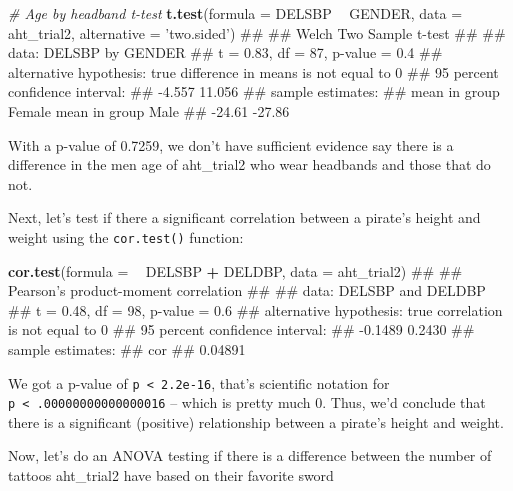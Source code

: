 \documentclass[12pt,]{krantz}
\makeatletter
\newenvironment{Shaded}{\begin{snugshade}}{\end{snugshade}}
\newcommand{\KeywordTok}[1]{\textcolor[rgb]{0.13,0.29,0.53}{\textbf{#1}}}
\newcommand{\DataTypeTok}[1]{\textcolor[rgb]{0.13,0.29,0.53}{#1}}
\newcommand{\StringTok}[1]{\textcolor[rgb]{0.31,0.60,0.02}{#1}}
\newcommand{\CommentTok}[1]{\textcolor[rgb]{0.56,0.35,0.01}{\textit{#1}}}
\newcommand{\OperatorTok}[1]{\textcolor[rgb]{0.81,0.36,0.00}{\textbf{#1}}}
\newcommand{\NormalTok}[1]{#1}
\newenvironment{kframe}{%
\medskip{}
\setlength{\fboxsep}{.8em}
 \def\at@end@of@kframe{}%
 \ifinner\ifhmode%
  \def\at@end@of@kframe{\end{minipage}}%
  \begin{minipage}{\columnwidth}%
 \fi\fi%
 \def\FrameCommand##1{\hskip\@totalleftmargin \hskip-\fboxsep
 \colorbox{shadecolor}{##1}\hskip-\fboxsep
     \hskip-\linewidth \hskip-\@totalleftmargin \hskip\columnwidth}%
 \MakeFramed {\advance\hsize-\width
   \@totalleftmargin\z@ \linewidth\hsize
   \@setminipage}}%
 {\par\unskip\endMakeFramed%
 \at@end@of@kframe}
\renewenvironment{Shaded}{\begin{kframe}}{\end{kframe}}
\theoremstyle{definition}
\theoremstyle{definition}
\theoremstyle{remark}
\makeatother
\begin{document}
\begin{Shaded}
\begin{Highlighting}[]
\CommentTok{# Age by headband t-test}
\KeywordTok{t.test}\NormalTok{(}\DataTypeTok{formula =}\NormalTok{  DELSBP }\OperatorTok{~}\StringTok{ }\NormalTok{GENDER,}
       \DataTypeTok{data =}\NormalTok{ aht_trial2,}
       \DataTypeTok{alternative =} \StringTok{'two.sided'}\NormalTok{)}
\NormalTok{## }
\NormalTok{##  Welch Two Sample t-test}
\NormalTok{## }
\NormalTok{## data:  DELSBP by GENDER}
\NormalTok{## t = 0.83, df = 87, p-value = 0.4}
\NormalTok{## alternative hypothesis: true difference in means is not equal to 0}
\NormalTok{## 95 percent confidence interval:}
\NormalTok{##  -4.557 11.056}
\NormalTok{## sample estimates:}
\NormalTok{## mean in group Female   mean in group Male }
\NormalTok{##               -24.61               -27.86}
\end{Highlighting}
\end{Shaded}

With a p-value of 0.7259, we don't have sufficient evidence say there is
a difference in the men age of aht\_trial2 who wear headbands and those
that do not.

Next, let's test if there a significant correlation between a pirate's
height and weight using the \texttt{cor.test()} function:

\begin{Shaded}
\begin{Highlighting}[]
\KeywordTok{cor.test}\NormalTok{(}\DataTypeTok{formula =} \OperatorTok{~}\StringTok{ }\NormalTok{DELSBP }\OperatorTok{+}\StringTok{ }\NormalTok{DELDBP,}
         \DataTypeTok{data =}\NormalTok{ aht_trial2)}
\NormalTok{## }
\NormalTok{##  Pearson's product-moment correlation}
\NormalTok{## }
\NormalTok{## data:  DELSBP and DELDBP}
\NormalTok{## t = 0.48, df = 98, p-value = 0.6}
\NormalTok{## alternative hypothesis: true correlation is not equal to 0}
\NormalTok{## 95 percent confidence interval:}
\NormalTok{##  -0.1489  0.2430}
\NormalTok{## sample estimates:}
\NormalTok{##     cor }
\NormalTok{## 0.04891}
\end{Highlighting}
\end{Shaded}

We got a p-value of \texttt{p\ \textless{}\ 2.2e-16}, that's scientific
notation for \texttt{p\ \textless{}\ .00000000000000016} -- which is
pretty much 0. Thus, we'd conclude that there is a significant
(positive) relationship between a pirate's height and weight.

Now, let's do an ANOVA testing if there is a difference between the
number of tattoos aht\_trial2 have based on their favorite sword
\end{document}
